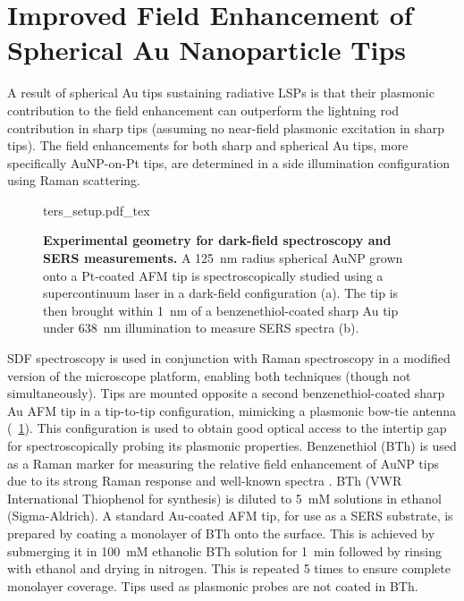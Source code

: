\documentclass{article}
\begin{document}
\section{Improved Field Enhancement of Spherical Au Nanoparticle Tips}
\label{sec:tip_applications}

A result of spherical Au tips sustaining radiative LSPs is that their plasmonic contribution to the field enhancement can outperform the lightning rod contribution in sharp tips (assuming no near-field plasmonic excitation in sharp tips). The field enhancements for both sharp and spherical Au tips, more specifically AuNP-on-Pt tips, are determined in a side illumination configuration using Raman scattering.

\begin{figure}[bt]
\centering
\def\svgwidth{0.6\textwidth}\fontsize{10pt}{1em}\selectfont
{ters_setup.pdf_tex}
\caption[Experimental geometry for dark-field spectroscopy and SERS measurements]{\textbf{Experimental geometry for dark-field spectroscopy and SERS measurements.} A \SI{125}{nm} radius spherical AuNP grown onto a Pt-coated AFM tip is spectroscopically studied using a supercontinuum laser in a dark-field configuration (a). The tip is then brought within \SI{1}{nm} of a benzenethiol-coated sharp Au tip under \SI{638}{nm} illumination to measure SERS spectra (b).}
\label{fig:ters_setup}
\end{figure}

SDF spectroscopy is used in conjunction with Raman spectroscopy in a modified version of the microscope platform, enabling both techniques (though not simultaneously). Tips are mounted opposite a second benzenethiol-coated sharp Au AFM tip in a tip-to-tip configuration, mimicking a plasmonic bow-tie antenna (\figurename~\ref{fig:ters_setup}). This configuration is used to obtain good optical access to the intertip gap for spectroscopically probing its plasmonic properties. Benzenethiol (BTh) is used as a Raman marker for measuring the relative field enhancement of AuNP tips due to its strong Raman response and well-known spectra \cite{mahajan2009, dudin2010}.
BTh (VWR International Thiophenol for synthesis) is diluted to \SI{5}{mM} solutions in ethanol (Sigma-Aldrich). A standard Au-coated AFM tip, for use as a SERS substrate, is prepared by coating a monolayer of BTh onto the surface. This is achieved by submerging it in \SI{100}{mM} ethanolic BTh solution for \SI{1}{\minute} followed by rinsing with ethanol and drying in nitrogen. This is repeated 5 times to ensure complete monolayer coverage. Tips used as plasmonic probes are not coated in BTh.
\end{document}
